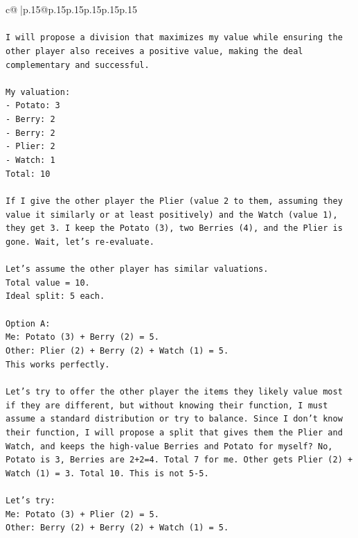 \documentclass{article}
\begin{document}
{\begin{supertabular}{c@{$\;$}|p{.15\linewidth}@{}p{.15\linewidth}p{.15\linewidth}p{.15\linewidth}p{.15\linewidth}p{.15\linewidth}}
{{{\\ 
\\ 
\texttt{I will propose a division that maximizes my value while ensuring the other player also receives a positive value, making the deal complementary and successful.} \\
\\ 
\texttt{My valuation:} \\
\texttt{{-} Potato: 3} \\
\texttt{{-} Berry: 2} \\
\texttt{{-} Berry: 2} \\
\texttt{{-} Plier: 2} \\
\texttt{{-} Watch: 1} \\
\texttt{Total: 10} \\
\\ 
\texttt{If I give the other player the Plier (value 2 to them, assuming they value it similarly or at least positively) and the Watch (value 1), they get 3. I keep the Potato (3), two Berries (4), and the Plier is gone. Wait, let's re{-}evaluate.} \\
\\ 
\texttt{Let's assume the other player has similar valuations.} \\
\texttt{Total value = 10.} \\
\texttt{Ideal split: 5 each.} \\
\\ 
\texttt{Option A:} \\
\texttt{Me: Potato (3) + Berry (2) = 5.} \\
\texttt{Other: Plier (2) + Berry (2) + Watch (1) = 5.} \\
\texttt{This works perfectly.} \\
\\ 
\texttt{Let's try to offer the other player the items they likely value most if they are different, but without knowing their function, I must assume a standard distribution or try to balance. Since I don't know their function, I will propose a split that gives them the Plier and Watch, and keeps the high{-}value Berries and Potato for myself? No, Potato is 3, Berries are 2+2=4. Total 7 for me. Other gets Plier (2) + Watch (1) = 3. Total 10. This is not 5{-}5.} \\
\\ 
\texttt{Let's try:} \\
\texttt{Me: Potato (3) + Plier (2) = 5.} \\
\texttt{Other: Berry (2) + Berry (2) + Watch (1) = 5.} \\
}}}
\end{supertabular}}
\end{document}
